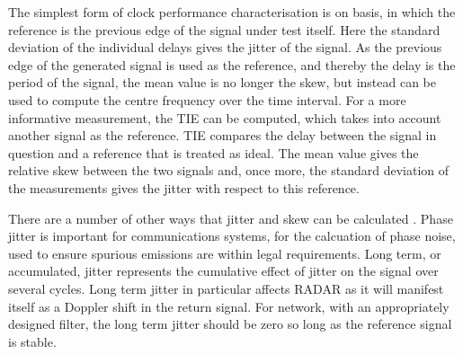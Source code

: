 The simplest form of clock performance characterisation is on  basis, in which the reference is the previous edge of the signal under test itself. Here the standard deviation of the individual delays gives the jitter of the signal. As the previous edge of the generated signal is used as the reference, and thereby the delay is the period of the signal, the mean value is no longer the skew, but instead can be used to compute the centre frequency over the time interval. For a more informative measurement, the \ac{TIE} can be computed, which takes into account another signal as the reference. \ac{TIE} compares the delay between the signal in question and a reference that is treated as ideal. The mean value gives the relative skew between the two signals and, once more, the standard deviation of the measurements gives the jitter with respect to this reference.

There are a number of other ways that jitter and skew can be calculated \cite{AN10007}. Phase jitter is important for communications systems, for the calcuation of phase noise, used to ensure spurious emissions are within legal requirements. Long term, or accumulated, jitter represents the cumulative effect of jitter on the signal over several cycles. Long term jitter in particular affects \acs*{RADAR} as it will manifest itself as a Doppler shift in the return signal. For  network, with an appropriately designed filter, the long term jitter should be zero so long as the reference signal is stable.